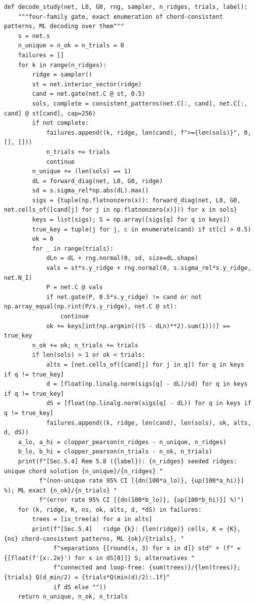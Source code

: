 \documentclass[11pt,a4paper]{article}
\theoremstyle{definition}
\theoremstyle{remark}
\begin{document}
\begin{lstlisting}
def decode_study(net, L0, G0, rng, sampler, n_ridges, trials, label):
    """four-family gate, exact enumeration of chord-consistent patterns, ML decoding over them"""
    s = net.s
    n_unique = n_ok = n_trials = 0
    failures = []
    for k in range(n_ridges):
        ridge = sampler()
        st = net.interior_vector(ridge)
        cand = net.gate(net.C @ st, 0.5)
        sols, complete = consistent_patterns(net.C[:, cand], net.C[:, cand] @ st[cand], cap=256)
        if not complete:
            failures.append((k, ridge, len(cand), f">={len(sols)}", 0, [], []))
            n_trials += trials
            continue
        n_unique += (len(sols) == 1)
        dL = forward_diag(net, L0, G0, ridge)
        sd = s.sigma_rel*np.abs(dL).max()
        sigs = {tuple(np.flatnonzero(x)): forward_diag(net, L0, G0, net.cells_of([cand[j] for j in np.flatnonzero(x)])) for x in sols}
        keys = list(sigs); S = np.array([sigs[q] for q in keys])
        true_key = tuple(j for j, c in enumerate(cand) if st[c] > 0.5)
        ok = 0
        for _ in range(trials):
            dLn = dL + rng.normal(0, sd, size=dL.shape)
            vals = st*s.y_ridge + rng.normal(0, s.sigma_rel*s.y_ridge, net.N_I)
            P = net.C @ vals
            if net.gate(P, 0.5*s.y_ridge) != cand or not np.array_equal(np.rint(P/s.y_ridge), net.C @ st):
                continue
            ok += keys[int(np.argmin(((S - dLn)**2).sum(1)))] == true_key
        n_ok += ok; n_trials += trials
        if len(sols) > 1 or ok < trials:
            alts = [net.cells_of([cand[j] for j in q]) for q in keys if q != true_key]
            d = [float(np.linalg.norm(sigs[q] - dL)/sd) for q in keys if q != true_key]
            dS = [float(np.linalg.norm(sigs[q] - dL)) for q in keys if q != true_key]
            failures.append((k, ridge, len(cand), len(sols), ok, alts, d, dS))
    a_lo, a_hi = clopper_pearson(n_ridges - n_unique, n_ridges)
    b_lo, b_hi = clopper_pearson(n_trials - n_ok, n_trials)
    print(f"[Sec.5.4] Rem 5.8 ({label}): {n_ridges} seeded ridges: unique chord solution {n_unique}/{n_ridges} "
          f"(non-unique rate 95% CI [{dn(100*a_lo)}, {up(100*a_hi)}] %); ML exact {n_ok}/{n_trials} "
          f"(error rate 95% CI [{dn(100*b_lo)}, {up(100*b_hi)}] %)")
    for (k, ridge, K, ns, ok, alts, d, *dS) in failures:
        trees = [is_tree(a) for a in alts]
        print(f"[Sec.5.4]   ridge {k}: {len(ridge)} cells, K = {K}, {ns} chord-consistent patterns, ML {ok}/{trials}, "
              f"separations {[round(x, 3) for x in d]} std" + (f" = {[float(f'{x:.2e}') for x in dS[0]]} S; alternatives "
              f"connected and loop-free: {sum(trees)}/{len(trees)}; {trials} Q(d_min/2) = {trials*Q(min(d)/2):.1f}"
              if dS else ""))
    return n_unique, n_ok, n_trials



\end{lstlisting}
\end{document}
